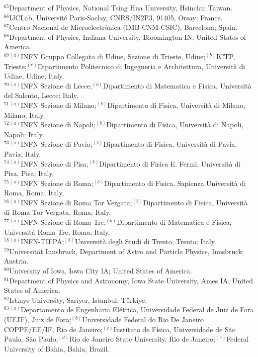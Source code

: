 \documentclass[PAPER, atlasdraft=false, USenglish, cernpreprint]{atlasdoc}
\begin{document}
\begin{flushleft}
$^{65}$Department of Physics, National Tsing Hua University, Hsinchu; Taiwan.\\
$^{66}$IJCLab, Universit\'e Paris-Saclay, CNRS/IN2P3, 91405, Orsay; France.\\
$^{67}$Centro Nacional de Microelectrónica (IMB-CNM-CSIC), Barcelona; Spain.\\
$^{68}$Department of Physics, Indiana University, Bloomington IN; United States of America.\\
$^{69}$$^{(a)}$INFN Gruppo Collegato di Udine, Sezione di Trieste, Udine;$^{(b)}$ICTP, Trieste;$^{(c)}$Dipartimento Politecnico di Ingegneria e Architettura, Universit\`a di Udine, Udine; Italy.\\
$^{70}$$^{(a)}$INFN Sezione di Lecce;$^{(b)}$Dipartimento di Matematica e Fisica, Universit\`a del Salento, Lecce; Italy.\\
$^{71}$$^{(a)}$INFN Sezione di Milano;$^{(b)}$Dipartimento di Fisica, Universit\`a di Milano, Milano; Italy.\\
$^{72}$$^{(a)}$INFN Sezione di Napoli;$^{(b)}$Dipartimento di Fisica, Universit\`a di Napoli, Napoli; Italy.\\
$^{73}$$^{(a)}$INFN Sezione di Pavia;$^{(b)}$Dipartimento di Fisica, Universit\`a di Pavia, Pavia; Italy.\\
$^{74}$$^{(a)}$INFN Sezione di Pisa;$^{(b)}$Dipartimento di Fisica E. Fermi, Universit\`a di Pisa, Pisa; Italy.\\
$^{75}$$^{(a)}$INFN Sezione di Roma;$^{(b)}$Dipartimento di Fisica, Sapienza Universit\`a di Roma, Roma; Italy.\\
$^{76}$$^{(a)}$INFN Sezione di Roma Tor Vergata;$^{(b)}$Dipartimento di Fisica, Universit\`a di Roma Tor Vergata, Roma; Italy.\\
$^{77}$$^{(a)}$INFN Sezione di Roma Tre;$^{(b)}$Dipartimento di Matematica e Fisica, Universit\`a Roma Tre, Roma; Italy.\\
$^{78}$$^{(a)}$INFN-TIFPA;$^{(b)}$Universit\`a degli Studi di Trento, Trento; Italy.\\
$^{79}$Universit\"{a}t Innsbruck, Department of Astro and Particle Physics, Innsbruck; Austria.\\
$^{80}$University of Iowa, Iowa City IA; United States of America.\\
$^{81}$Department of Physics and Astronomy, Iowa State University, Ames IA; United States of America.\\
$^{82}$Istinye University, Sariyer, Istanbul; T\"urkiye.\\
$^{83}$$^{(a)}$Departamento de Engenharia El\'etrica, Universidade Federal de Juiz de Fora (UFJF), Juiz de Fora;$^{(b)}$Universidade Federal do Rio De Janeiro COPPE/EE/IF, Rio de Janeiro;$^{(c)}$Instituto de F\'isica, Universidade de S\~ao Paulo, S\~ao Paulo;$^{(d)}$Rio de Janeiro State University, Rio de Janeiro;$^{(e)}$Federal University of Bahia, Bahia; Brazil.\\
$$
\end{flushleft}
\end{document}
